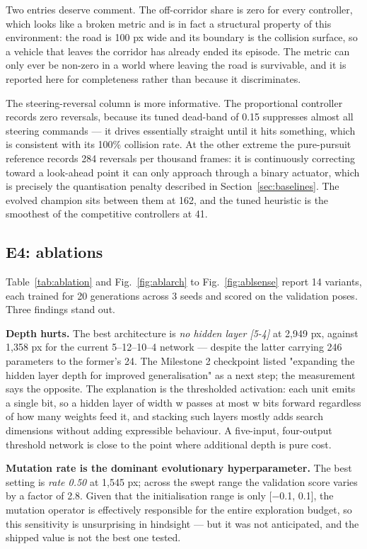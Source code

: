 \documentclass[conference]{IEEEtran}
\begin{document}
Two entries deserve comment. The off-corridor share is zero for every controller, which looks like a broken metric and is in fact a structural property of this environment: the road is 100 px wide and its boundary is the collision surface, so a vehicle that leaves the corridor has already ended its episode. The metric can only ever be non-zero in a world where leaving the road is survivable, and it is reported here for completeness rather than because it discriminates.

The steering-reversal column is more informative. The proportional controller records zero reversals, because its tuned dead-band of 0.15 suppresses almost all steering commands — it drives essentially straight until it hits something, which is consistent with its 100\% collision rate. At the other extreme the pure-pursuit reference records 284 reversals per thousand frames: it is continuously correcting toward a look-ahead point it can only approach through a binary actuator, which is precisely the quantisation penalty described in Section~\ref{sec:baselines}. The evolved champion sits between them at 162, and the tuned heuristic is the smoothest of the competitive controllers at 41.

\subsection{E4: ablations}

Table~\ref{tab:ablation} and Fig.~\ref{fig:ablarch} to Fig.~\ref{fig:ablsense} report 14 variants, each trained for 20 generations across 3 seeds and scored on the validation poses. Three findings stand out.

\textbf{Depth hurts.} The best architecture is \emph{no hidden layer [5-4]} at 2,949 px, against 1,358 px for the current 5–12–10–4 network — despite the latter carrying 246 parameters to the former's 24. The Milestone 2 checkpoint listed "expanding the hidden layer depth for improved generalisation" as a next step; the measurement says the opposite. The explanation is the thresholded activation: each unit emits a single bit, so a hidden layer of width w passes at most w bits forward regardless of how many weights feed it, and stacking such layers mostly adds search dimensions without adding expressible behaviour. A five-input, four-output threshold network is close to the point where additional depth is pure cost.

\textbf{Mutation rate is the dominant evolutionary hyperparameter.} The best setting is \emph{rate 0.50} at 1,545 px; across the swept range the validation score varies by a factor of 2.8. Given that the initialisation range is only [−0.1, 0.1], the mutation operator is effectively responsible for the entire exploration budget, so this sensitivity is unsurprising in hindsight — but it was not anticipated, and the shipped value is not the best one tested.
\end{document}
